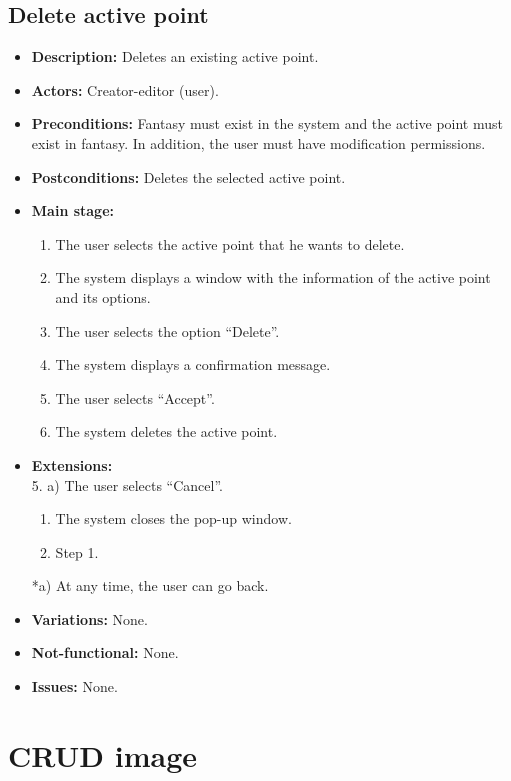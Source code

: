 \subsection{Delete active point}
\begin{itemize}
	\item \textbf{Description:} Deletes an existing active point.
	\item \textbf{Actors:} Creator-editor (user).
	\item \textbf{Preconditions:} Fantasy must exist in the system and the active point must exist in fantasy. In addition, the user must have modification permissions.
	\item \textbf{Postconditions:} Deletes the selected active point.
	\item \textbf{Main stage:}
	\begin{enumerate}
		\item The user selects the active point that he wants to delete.
		\item The system displays a window with the information of the active point and its options.
		\item The user selects the option ``Delete''.
		\item The system displays a confirmation message.
		\item The user selects ``Accept''.
		\item The system deletes the active point.
	\end{enumerate}
	\item \textbf{Extensions:} \\ 5. a) The user selects ``Cancel''.
	\begin{enumerate}
		\item The system closes the pop-up window.
		\item Step 1.
	\end{enumerate}
	*a) At any time, the user can go back.
	\item \textbf{Variations:} None.
	\item \textbf{Not-functional:} None.
	\item \textbf{Issues:} None.
\end{itemize}

\section{CRUD image}
\hypertarget{crearimagen}{}
